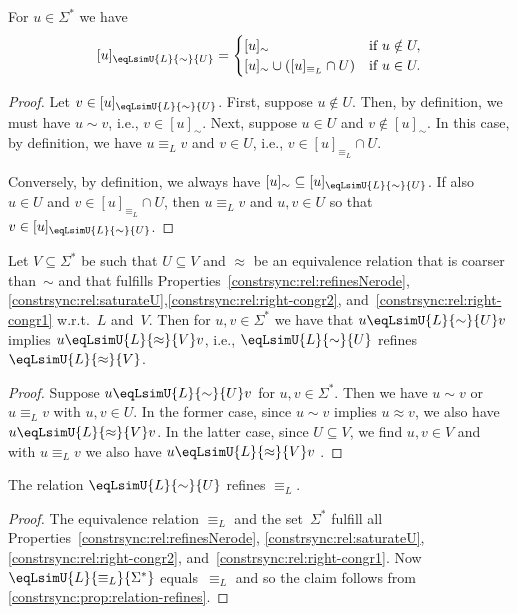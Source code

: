 \begin{proposition} \label{constrsync:prop:equiv-classes-form}
For $u \in \Sigma^*$ we have
\[
[u]_{\eqLsimU{L}{\sim}{U}}
= 
\begin{cases}
	[u]_{\sim}               & \text{if } u \notin U, \\
	[u]_{\sim} \cup ( [u]_{\equiv_L} \cap U ) & \text{if } u \in U.
\end{cases}
\]
\end{proposition}
\begin{proof}
Let $v \in [u]_{\eqLsimU{L}{\sim}{U}}$.
First, suppose $u \notin U$.
Then, by definition,
we must have $u \sim v$, i.e., $v \in [u]_{\sim}$.
Next, suppose $u \in U$
and $v \notin [u]_{\sim}$.
In this case, by definition,
we have $u \equiv_L v$ and $v \in U$, i.e.,
$v \in [u]_{\equiv_L} \cap U$.

Conversely, by definition,
we always have $[u]_{\sim} \subseteq [u]_{\eqLsimU{L}{\sim}{U}}$.
If also $u \in U$ and $v \in [u]_{\equiv_L} \cap U$,
then $u \equiv_L v$ and $u,v \in U$
so that $v \in [u]_{\eqLsimU{L}{\sim}{U}}$.
\end{proof}

\begin{proposition} \label{constrsync:prop:relation-refines}
Let $V \subseteq \Sigma^*$ be such that $U \subseteq V$
and $\approx$ be an equivalence
relation that is coarser than~$\sim$ and that fulfills
Properties~\ref{constrsync:rel:refinesNerode},
\ref{constrsync:rel:saturateU},\ref{constrsync:rel:right-congr2}, and~\ref{constrsync:rel:right-congr1} w.r.t.~$L$ and~$V$. %
Then for $u,v \in \Sigma^*$ we have that
$u \eqLsimU{L}{\sim}{U} v$
implies
$u \eqLsimU{L}{\approx}{V} v$, i.e., $\eqLsimU{L}{\sim}{U}$ refines $\eqLsimU{L}{\approx}{V}$.
\end{proposition}
\begin{proof}
Suppose $u \eqLsimU{L}{\sim}{U} v$ for $u,v \in \Sigma^*$.
Then we have $u \sim v$
or $u \equiv_L v$ with $u,v \in U$.
In the former case, since $u \sim v$
implies $u \approx v$,
we also have $u \eqLsimU{L}{\approx}{V} v$.
In the latter case, since $U \subseteq V$,
we find $u,v \in V$
and with $u\equiv_L v$
we also have $u \eqLsimU{L}{\approx}{V} v$ .
\end{proof}

\begin{corollary} \label{constrsync:cor:relation-refines_Nerode}
The relation $\eqLsimU{L}{\sim}{U}$
refines $\equiv_L$.
\end{corollary} 
\begin{proof}
The equivalence relation $\equiv_L$ and the set~$\Sigma^*$
fulfill all Properties~\ref{constrsync:rel:refinesNerode},
\ref{constrsync:rel:saturateU},\ref{constrsync:rel:right-congr2}, and~\ref{constrsync:rel:right-congr1}.
Now $\eqLsimU{L}{\equiv_L}{\Sigma^*}$
equals~$\equiv_L$ and so the claim follows from \cref{constrsync:prop:relation-refines}.
\end{proof}

